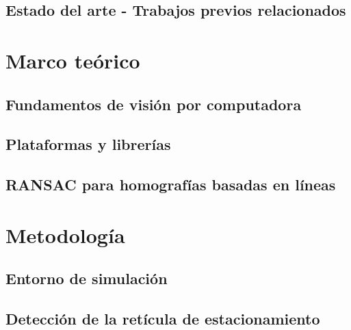 \documentclass[10pt,letterpaper,final]{article}
\begin{document}
\subsection{Estado del arte - Trabajos previos relacionados}


% 

\clearpage
\section{Marco teórico}\label{chap:marco-teorico}


\subsection{Fundamentos de visión por computadora}\label{sec:vision}


\subsection{Plataformas y librerías}\label{sec:plataformas}


\subsection{RANSAC para homografías basadas en líneas}\label{sec:ransac-teorico}


\clearpage
\section{Metodología}\label{chap:metodologia}


\subsection{Entorno de simulación}\label{sec:carla}


\subsection{Detección de la retícula de estacionamiento}\label{sec:metodo-reticula}

\end{document}
